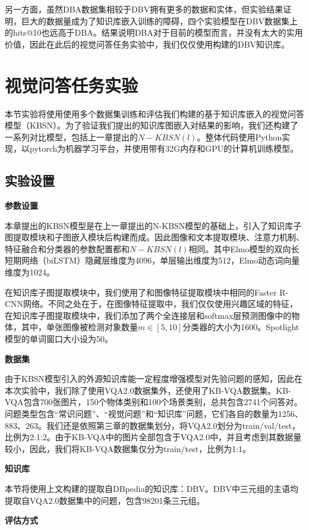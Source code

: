 另一方面，虽然DBA数据集相较于DBV拥有更多的数据和实体，但实验结果证明，巨大的数据量成为了知识库嵌入训练的障碍，四个实验模型在DBV数据集上的hits@10也远高于DBA。结果说明DBA对于目前的模型而言，并没有太大的实用价值，因此在此后的视觉问答任务实验中，我们仅仅使用构建的DBV知识库。

\section{视觉问答任务实验}
本节实验将使用使用多个数据集训练和评估我们构建的基于知识库嵌入的视觉问答模型（KBSN）。为了验证我们提出的知识库图嵌入对结果的影响，我们还构建了一系列对比模型，包括上一章提出的$N-KBSN(l)$。整体代码使用Python实现，以pytorch为机器学习平台，并使用带有32G内存和GPU的计算机训练模型。

\subsection{实验设置}
\textbf{参数设置}

本章提出的KBSN模型是在上一章提出的N-KBSN模型的基础上，引入了知识库子图提取模块和子图嵌入模块后构建而成。因此图像和文本提取模块、注意力机制、特征融合和分类器的参数配置都和$N-KBSN(l)$相同。其中Elmo模型的双向长短期网络（biLSTM）隐藏层维度为4096，单层输出维度为512，Elmo动态词向量维度为1024。

在知识库子图提取模块中，我们使用了和图像特征提取模块中相同的Faster R-CNN网络。不同之处在于，在图像特征提取中，我们仅仅使用兴趣区域的特征，在知识库子图提取模块中，我们添加了两个全连接层和softmax层预测图像中的物体，其中，单张图像被检测对象数量$m\in [5, 10]$分类器的大小为1600。Spotlight模型的单词窗口大小设为50。

\textbf{数据集}

由于KBSN模型引入的外源知识库能一定程度增强模型对先验问题的感知，因此在本次实验中，我们除了使用VQA2.0数据集外，还使用了KB-VQA数据集。KB-VQA包含700张图片，150个物体类别和100个场景类别，总共包含2741个问答对。问题类型包含“常识问题”、“视觉问题”和“知识库”问题，它们各自的数量为1256、883、263。我们还是依照第三章的数据集划分，将VQA2.0划分为train/val/test，比例为2:1:2。由于KB-VQA中的图片全部包含于VQA2.0中，并且考虑到其数据量较小，因此，我们将KB-VQA数据集仅分为train/test，比例为1:1。

\textbf{知识库}

本节将使用上文构建的提取自DBpedia的知识库：DBV。DBV中三元组的主语均提取自VQA2.0数据集中的问题，包含98201条三元组。

\textbf{评估方式}

